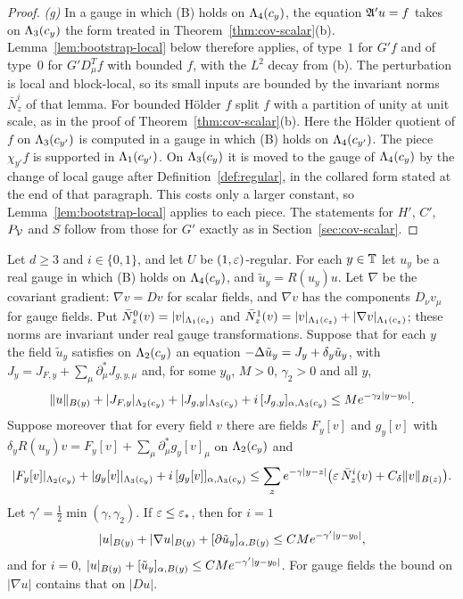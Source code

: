 \begin{proof}
\emph{(g)} In a gauge in which (B) holds on $\Lambda_4(c_y)$, the equation $\mathfrak A'u=f$ takes on $\Lambda_3(c_y)$ the form treated in Theorem~\ref{thm:cov-scalar}(b). Lemma~\ref{lem:bootstrap-local} below therefore applies, of type~$1$ for $G'f$ and of type~$0$ for $G'D^T_\mu f$ with bounded $f$, with the $L^2$ decay from (b). The perturbation is local and block-local, so its small inputs are bounded by the invariant norms $\bar N^i_z$ of that lemma. For bounded H\"older $f$ split $f$ with a partition of unity at unit scale, as in the proof of Theorem~\ref{thm:cov-scalar}(b). Here the H\"older quotient of $f$ on $\Lambda_3(c_{y'})$ is computed in a gauge in which (B) holds on $\Lambda_4(c_{y'})$. The piece $\chi_{y'}f$ is supported in $\Lambda_1(c_{y'})$. On $\Lambda_3(c_y)$ it is moved to the gauge of $\Lambda_4(c_y)$ by the change of local gauge after Definition~\ref{def:regular}, in the collared form stated at the end of that paragraph. This costs only a larger constant, so Lemma~\ref{lem:bootstrap-local} applies to each piece. The statements for $H'$, $C'$, $P_\mathcal V$ and $S$ follow from those for $G'$ exactly as in Section~\ref{sec:cov-scalar}.
\end{proof}

\begin{lemma}\label{lem:bootstrap-local}
Let $d\ge3$ and $i\in\{0,1\}$, and let $U$ be $(1,\varepsilon)$-regular. For each $y\in\mathbb T$ let $u_y$ be a real gauge in which (B) holds on $\Lambda_4(c_y)$, and $\tilde u_y=R(u_y)u$. Let $\nabla$ be the covariant gradient: $\nabla v=Dv$ for scalar fields, and $\nabla v$ has the components $D_\nu v_\mu$ for gauge fields. Put $\bar N^0_z(v)=|v|_{\Lambda_1(c_z)}$ and $\bar N^1_z(v)=|v|_{\Lambda_1(c_z)}+|\nabla v|_{\Lambda_1(c_z)}$; these norms are invariant under real gauge transformations. Suppose that for each $y$ the field $\tilde u_y$ satisfies on $\Lambda_2(c_y)$ an equation $-\Delta\tilde u_y=J_y+\delta_y\tilde u_y$, with $J_y=J_{F,y}+\sum_\mu\partial^*_\mu J_{g,y,\mu}$ and, for some $y_0$, $M>0$, $\gamma_2>0$ and all $y$,
\[
\|u\|_{B(y)}+|J_{F,y}|_{\Lambda_2(c_y)}+|J_{g,y}|_{\Lambda_3(c_y)}+i\,[J_{g,y}]_{\alpha,\Lambda_3(c_y)}\le Me^{-\gamma_2|y-y_0|}.
\]
Suppose moreover that for every field $v$ there are fields $F_y[v]$ and $g_y[v]$ with $\delta_yR(u_y)v=F_y[v]+\sum_\mu\partial^*_\mu g_y[v]_\mu$ on $\Lambda_2(c_y)$ and
\[
|F_y[v]|_{\Lambda_2(c_y)}+|g_y[v]|_{\Lambda_3(c_y)}+i\,[g_y[v]]_{\alpha,\Lambda_3(c_y)}\le\sum_ze^{-\gamma|y-z|}\big(\varepsilon\,\bar N^i_z(v)+C_\delta\|v\|_{B(z)}\big).
\]
Let $\gamma'=\frac12\min(\gamma,\gamma_2)$. If $\varepsilon\le\varepsilon_*$, then for $i=1$
\[
|u|_{B(y)}+|\nabla u|_{B(y)}+[\partial\tilde u_y]_{\alpha,B(y)}\le CMe^{-\gamma'|y-y_0|},
\]
and for $i=0$, $|u|_{B(y)}+[\tilde u_y]_{\alpha,B(y)}\le CMe^{-\gamma'|y-y_0|}$. For gauge fields the bound on $|\nabla u|$ contains that on $|Du|$.
\end{lemma}

